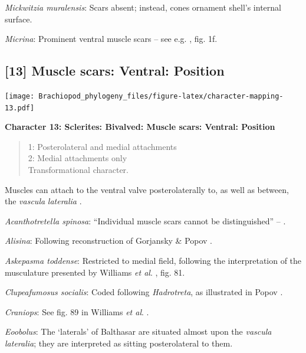 \documentclass[openany]{book}
\theoremstyle{definition}
\theoremstyle{definition}
\theoremstyle{definition}
\theoremstyle{remark}
\begin{document}
\hypertarget{Mickwitzia_muralensis-coding-12}{}
\emph{Mickwitzia muralensis}: Scars absent; instead, cones ornament
shell's internal surface.

\hypertarget{Micrina-coding-12}{}
\emph{Micrina}: Prominent ventral muscle scars -- see e.g.
\citet{Holmer2008TheEarly}, fig. 1f.

\subsection*{{[}13{]} Muscle scars: Ventral:
Position}\label{muscle-scars-ventral-position}

\texttt{[image: Brachiopod\_phylogeny\_files/figure-latex/character-mapping-13.pdf]}

\textbf{Character 13: Sclerites: Bivalved: Muscle scars: Ventral:
Position}

\begin{quote}
1: Posterolateral and medial attachments\\
2: Medial attachments only\\
Transformational character.
\end{quote}

Muscles can attach to the ventral valve posterolaterally to, as well as
between, the \emph{vascula} \emph{lateralia}
\citep{Popov1992TheCambrian}.

\hypertarget{Acanthotretella_spinosa-coding-13}{}
\emph{Acanthotretella spinosa}: ``Individual muscle scars cannot be
distinguished'' -- \citet{Holmer2006Aspinose}.

\hypertarget{Alisina-coding-13}{}
\emph{Alisina}: Following reconstruction of Gorjansky \& Popov
\citeyearpar{Gorjansky1986Onthe}.

\hypertarget{Askepasma_toddense-coding-13}{}
\emph{Askepasma toddense}: Restricted to medial field, following the
interpretation of the musculature presented by Williams \emph{et al}.
\citeyearpar{Williams2000LinguliformeaCraniiformea}, fig. 81.

\hypertarget{Clupeafumosus_socialis-coding-13}{}
\emph{Clupeafumosus socialis}: Coded following \emph{Hadrotreta}, as
illustrated in Popov \citeyearpar{Popov1992TheCambrian}.

\hypertarget{Craniops-coding-13}{}
\emph{Craniops}: See fig. 89 in Williams \emph{et al}.
\citeyearpar{Williams2000LinguliformeaCraniiformea}.

\hypertarget{Eoobolus-coding-13}{}
\emph{Eoobolus}: The `laterals' of Balthasar \citeyearpar[fig.
5]{Balthasar2009Thebrachiopod} are situated almost upon the
\emph{vascula} \emph{lateralia}; they are interpreted as sitting
posterolateral to them.
\end{document}
